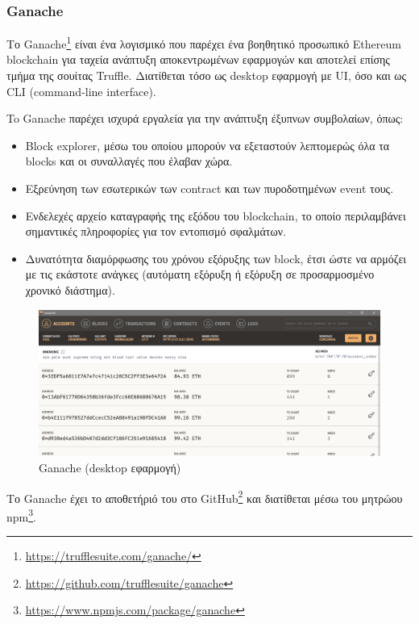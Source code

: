 \subsubsection{Ganache} \label{subsection:4-2-3-2-ganache}


Το Ganache\footnote{\url{https://trufflesuite.com/ganache/}} είναι ένα λογισμικό που παρέχει ένα βοηθητικό προσωπικό Ethereum blockchain για ταχεία ανάπτυξη αποκεντρωμένων εφαρμογών και αποτελεί επίσης τμήμα της σουίτας Truffle. Διατίθεται τόσο ως desktop εφαρμογή με UI, όσο και ως CLI (command-line interface).

To Ganache παρέχει ισχυρά εργαλεία για την ανάπτυξη έξυπνων συμβολαίων, όπως:
\begin{itemize}
	\item Block explorer, μέσω του οποίου μπορούν να εξεταστούν λεπτομερώς όλα τα blocks και οι συναλλαγές που έλαβαν χώρα.
	\item Εξρεύνηση των εσωτερικών των contract και των πυροδοτημένων event τους.
	\item Ενδελεχές αρχείο καταγραφής της εξόδου του blockchain, το οποίο περιλαμβάνει σημαντικές πληροφορίες για τον εντοπισμό σφαλμάτων.
	\item Δυνατότητα διαμόρφωσης του χρόνου εξόρυξης των block, έτσι ώστε να αρμόζει με τις εκάστοτε ανάγκες (αυτόματη εξόρυξη ή εξόρυξη σε προσαρμοσμένο χρονικό διάστημα).
\end{itemize}

\begin{figure}[H]
	\centering
	\includegraphics[width=\textwidth]{assets/figures/chapter-4/4.2.ganache-gui}
	\caption{Ganache (desktop εφαρμογή)}
\end{figure}

Το Ganache έχει το αποθετήριό του στο GitHub\footnote{\url{https://github.com/trufflesuite/ganache}} και διατίθεται μέσω του μητρώου npm\footnote{\url{https://www.npmjs.com/package/ganache}}.
